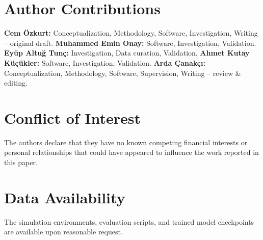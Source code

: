 \documentclass[11pt,a4paper]{article}
\begin{document}
\section*{Author Contributions}
\textbf{Cem \"Ozkurt:} Conceptualization, Methodology, Software, Investigation, Writing -- original draft. \textbf{Muhammed Emin Onay:} Software, Investigation, Validation. \textbf{Ey\"up Altu\u{g} Tun\c{c}:} Investigation, Data curation, Validation. \textbf{Ahmet Kutay K\"u\c{c}\"ukler:} Software, Investigation, Validation. \textbf{Arda \c{C}anak\c{c}\i:} Conceptualization, Methodology, Software, Supervision, Writing -- review \& editing.

\section*{Conflict of Interest}
The authors declare that they have no known competing financial interests or personal relationships that could have appeared to influence the work reported in this paper.

\section*{Data Availability}
The simulation environments, evaluation scripts, and trained model checkpoints are available upon reasonable request.



\end{document}
